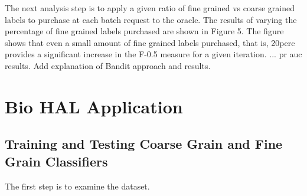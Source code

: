 \documentclass[ms]{nuthesis}
\begin{document}
\par The next analysis step is to apply a given ratio of fine grained vs coarse grained
labels to purchase at each batch request to the oracle. The results of varying the
percentage of fine grained labels purchased are shown in Figure 5. The figure shows
that even a small amount of fine grained labels purchased, that is, 20perc provides a
significant increase in the F-0.5 measure for a given iteration. ...  pr auc results.
Add explanation of Bandit approach and results.



\chapter{Bio HAL Application}\label{chap:math}
\section{Training and Testing Coarse Grain and Fine Grain Classifiers}
\par The first step is to examine the dataset.
\end{document}
